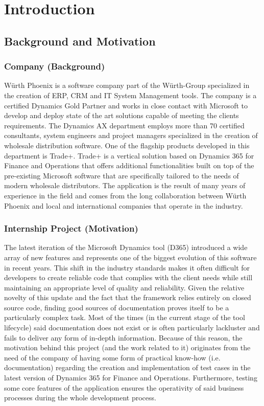 \chapter{Introduction}

\section{Background and Motivation} 

\subsection{Company (Background)}
Würth Phoenix is a software company part of the Würth-Group specialized in the creation of ERP, CRM and IT System Management tools. The company is a certified Dynamics Gold Partner and works in close contact with Microsoft to develop and deploy state of the art solutions capable of meeting the clients requirements. The Dynamics AX department employs more than 70 certified consultants, system engineers and project managers specialized in the creation of wholesale distribution software. One of the flagship products developed in this department is Trade+. Trade+ is a vertical solution based on Dynamics 365 for Finance and Operations that offers additional functionalities built on top of the pre-existing Microsoft software that are specifically tailored to the needs of modern wholesale distributors. The application is the result of many years of experience in the field and comes from the long collaboration between Würth Phoenix and local and international companies that operate in the industry.

\subsection{Internship Project (Motivation)}
The latest iteration of the Microsoft Dynamics tool (D365) introduced a wide array of new features and represents one of the biggest evolution of this software in recent years. This shift in the industry standards makes it often difficult for developers to create reliable code that complies with the client needs while still maintaining an appropriate level of quality and reliability. Given the relative novelty of this update and the fact that the framework relies entirely on closed source code, finding good sources of documentation proves itself to be a particularly complex task. Most of the times (in the current stage of the tool lifecycle) said documentation does not exist or is often particularly lackluster and fails to deliver any form of in-depth information. Because of this reason, the motivation behind this project (and the work related to it) originates from the need of the company of having some form of practical know-how (i.e. documentation) regarding the creation and implementation of test cases in the latest version of Dynamics 365 for Finance and Operations. Furthermore, testing some core features of the application ensures the operativity of said business processes during the whole development process.

